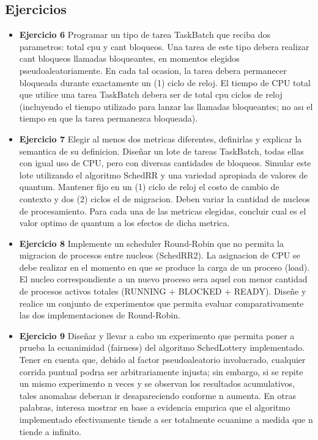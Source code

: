 
\subsection{Ejercicios}
\begin{itemize}
 
\item \textbf{Ejercicio 6}  Programar un tipo de tarea TaskBatch que reciba dos parametros: total cpu y
cant bloqueos. Una tarea de este tipo debera realizar cant bloqueos llamadas bloqueantes, en
momentos elegidos pseudoaleatoriamente. En cada tal ocasion, la tarea debera permanecer
bloqueada durante exactamente un (1) ciclo de reloj. El tiempo de CPU total que utilice una
tarea TaskBatch debera ser de total cpu ciclos de reloj (incluyendo el tiempo utilizado para
lanzar las llamadas bloqueantes; no ası el tiempo en que la tarea permanezca bloqueada).

\item \textbf{Ejercicio 7} Elegir al menos dos metricas diferentes, definirlas y explicar la semantica de
su definicion. Diseñar un lote de tareas TaskBatch, todas ellas con igual uso de CPU, pero
con diversas cantidades de bloqueos. Simular este lote utilizando el algoritmo SchedRR y una
variedad apropiada de valores de quantum. Mantener fijo en un (1) ciclo de reloj el costo de
cambio de contexto y dos (2) ciclos el de migracion. Deben variar la cantidad de nucleos de
procesamiento. Para cada una de las metricas elegidas, concluir cual es el valor optimo de
quantum a los efectos de dicha metrica.

\item \textbf{Ejercicio 8} Implemente un scheduler Round-Robin que no permita la migracion de procesos
entre nucleos (SchedRR2). La asignacion de CPU se debe realizar en el momento en que se produce la carga 
de un proceso (load). El nucleo correspondiente a un nuevo proceso sera aquel
con menor cantidad de procesos activos totales (RUNNING + BLOCKED + READY). Diseñe y realice un conjunto 
de experimentos que permita evaluar comparativamente las dos implementaciones de Round-Robin.

\item \textbf{Ejercicio 9} Diseñar y llevar a cabo un experimento que permita poner a prueba la ecuanimidad 
(fairness) del algoritmo SchedLottery implementado. Tener en cuenta que, debido
al factor pseudoaleatorio involucrado, cualquier corrida puntual podrıa ser arbitrariamente
injusta; sin embargo, si se repite un mismo experimento n veces y se observan los resultados acumulativos, 
tales anomalıas deberıan ir desapareciendo conforme n aumenta. En otras
palabras, interesa mostrar en base a evidencia empırica que el algoritmo implementado efectivamente tiende 
a ser totalmente ecuanime a medida que n tiende a infinito.


\end{itemize}
